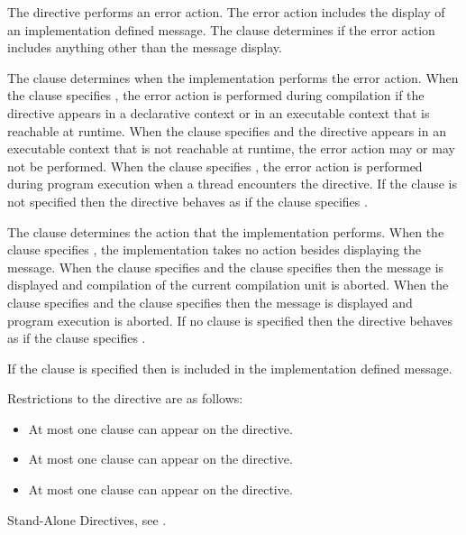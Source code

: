 \descr

The  directive performs an error action. The error action
includes the display of an implementation defined message. The 
clause determines if the error action includes anything other than the
message display.

The  clause determines when the implementation performs the error 
action. When the  clause specifies , the error action 
is performed during compilation if the  directive appears in a 
declarative context or in an executable context that is reachable at
runtime. When the  clause specifies  and the 
 directive appears in an executable context that is not 
reachable at runtime, the error action may or may not be performed. When the 
 clause specifies , the error action is performed 
during program execution when a thread encounters the directive. If the 
 clause is not specified then the  directive behaves 
as if the  clause specifies .

The  clause determines the action that the implementation
performs. When the  clause specifies , the 
implementation takes no action besides displaying the message. When the 
 clause specifies  and the  clause 
specifies   then the message is displayed and compilation 
of the current compilation unit is aborted. When the  
clause specifies  and  the  clause specifies 
 then the message is displayed and program execution is 
aborted. If no  clause is specified then the  
directive behaves as if the  clause specifies .

If the  clause is specified then  is included 
in the implementation defined message.

\restrictions
Restrictions to the  directive are as follows:

\begin{itemize}
\item At most one  clause can appear on the directive.
\item At most one  clause can appear on the directive.
\item At most one  clause can appear on the directive.
\end{itemize}

\begin{crossrefs}
\item Stand-Alone Directives, see .
\end{crossrefs}

